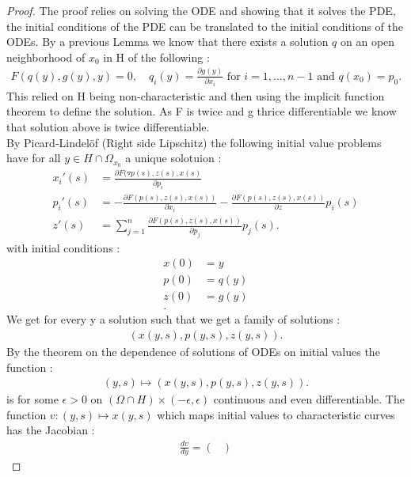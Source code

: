 \begin{proof}
 The proof relies on solving the ODE and showing that it solves the PDE, 
 the initial conditions of the PDE can be translated to the initial conditions of the ODEs. 
 By a previous Lemma we know that there exists a solution $q$ on an open neighborhood of $x_0$ in H of the following : 
 \begin{align*}
   F(q(y),g(y),y)=0 ,\quad q_i(y) = \frac{\partial g(y)}{\partial x_{i}} \text{ for } i=1,\ldots ,n-1 \text{  and  } q(x_0)  = p_0
 .\end{align*}
 This relied on H being non-characteristic and then using the implicit function theorem to define the solution.
 As F is twice and g thrice differentiable we know that solution above is twice differentiable. \\
 By Picard-Lindelöf (Right side Lipschitz) the following initial value problems have for all $y \in  H \cap \Omega_{x_0}$  a unique solotuion : 
  \begin{align*}
    x_i'(s) &= \frac{\partial F(\triangledown p(s),z(s),x(s)}{\partial p_i} \\
    p_i'(s) &= - \frac{\partial F(p(s),z(s),x(s))}{\partial x_{i}} - \frac{\partial F(p(s),z(s),x(s))}{\partial z} p_i(s)    \\
    z'(s) &= \sum_{j=1}^{n}  \frac{\partial F(p(s),z(s),x(s))}{\partial p_{j}}p_j(s) 
  .\end{align*}
  with initial conditions : 
  \begin{align*}
    x(0) &= y \\
    p(0) &= q(y) \\
    z(0) &= g(y) \\
  .\end{align*}
  We get for every y a solution such that we get a family of solutions : 
  \begin{align*}
    (x(y,s),p(y,s),z(y,s))
  .\end{align*}
  By the theorem on the dependence of solutions of ODEs on initial values the function : 
  \begin{align*}
    (y,s) \mapsto (x(y,s),p(y,s),z(y,s))
  .\end{align*}
  is for some $\epsilon >0$ on $(\Omega \cap H) \times (-\epsilon ,\epsilon )$ continuous and even differentiable.
  The function $v : (y,s) \mapsto x(y,s)$ which maps initial values to characteristic curves has the Jacobian :
  \begin{align*}
    \frac{d v}{dy}  = \begin{pmatrix}

\end{pmatrix}
\end{align*}
\end{proof}
